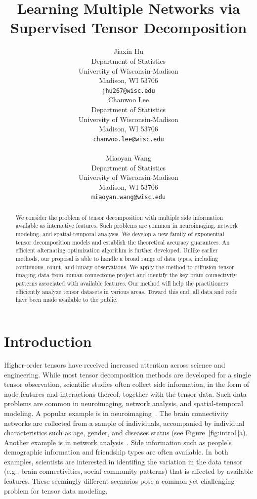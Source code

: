 \documentclass{article}
\title{Learning Multiple Networks via Supervised Tensor Decomposition}
\author{%
  Jiaxin Hu \\
  Department of Statistics\\
  University of Wisconsin-Madison\\
  Madison, WI 53706\\
  \texttt{jhu267@wisc.edu} \\
  
  \And
  Chanwoo Lee \\
  Department of Statistics\\
  University of Wisconsin-Madison\\
  Madison, WI 53706\\
  \texttt{chanwoo.lee@wisc.edu} \\
  
  \And
  
  Miaoyan Wang \\
  Department of Statistics\\
  University of Wisconsin-Madison\\
  Madison, WI 53706\\
  \texttt{miaoyan.wang@wisc.edu} \\

}
\theoremstyle{definition}
\theoremstyle{definition}
\begin{document}
\maketitle

\begin{abstract}
We consider the problem of tensor decomposition with multiple side information available as interactive features. Such problems are common in neuroimaging, network modeling, and spatial-temporal analysis. We develop a new family of exponential tensor decomposition models and establish the theoretical accuracy guarantees. An efficient alternating optimization algorithm is further developed. Unlike earlier methods, our proposal is able to handle a broad range of data types, including continuous, count, and binary observations. We apply the method to diffusion tensor imaging data from human connectome project and identify the key brain connectivity patterns associated with available features. Our method will help the practitioners efficiently analyze tensor datasets in various areas. Toward this end, all data and code have been made available to the public. 
\end{abstract}

\section{Introduction}
 Higher-order tensors have received increased attention across science and engineering. While most tensor decomposition methods are developed for a single tensor observation, scientific studies often collect side information, in the form of node features and interactions thereof, together with the tensor data. Such data problems are common in neuroimaging, network analysis, and spatial-temporal modeling. A popular example is in neuroimaging~\citep{zhou2013tensor}. The brain connectivity networks are collected from a sample of individuals, accompanied by individual characteristics such as age, gender, and diseases status (see Figure~\ref{fig:intro1}a). Another example is in network analysis~\citep{pmlr-v108-berthet20a}. Side information such as people’s demographic information and friendship types are often available. In both examples, scientists are interested in identifing the variation in the data tensor (e.g., brain connectivities, social community patterns) that is affected by available features. These seemingly different scenarios pose a common yet challenging problem for tensor data modeling. 
 
\end{document}
